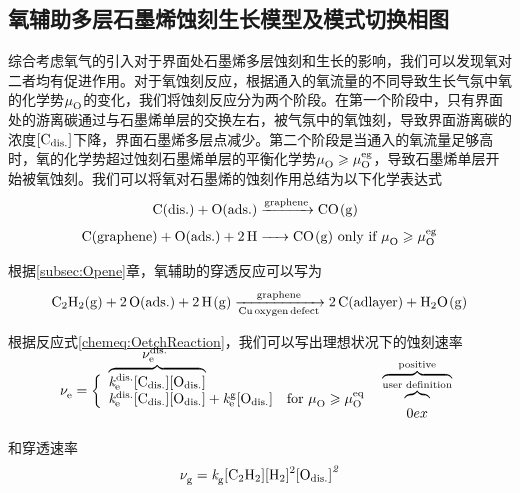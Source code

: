 \subsection{氧辅助多层石墨烯蚀刻生长模型及模式切换相图}
综合考虑氧气的引入对于界面处石墨烯多层蚀刻和生长的影响，我们可以发现氧对二者均有促进作用。对于氧蚀刻反应，根据通入的氧流量的不同导致生长气氛中氧的化学势$\mu_{\rm O}^{\rm } \it$的变化，我们将蚀刻反应分为两个阶段。在第一个阶段中，只有界面处的游离碳通过与石墨烯单层的交换左右，被气氛中的氧蚀刻，导致界面游离碳的浓度$\rm{\left[C_{dis.}\right]} \it$下降，界面石墨烯多层点减少。第二个阶段是当通入的氧流量足够高时，氧的化学势超过蚀刻石墨烯单层的平衡化学势$\mu_{\rm O}^{\rm } \it \geqslant \mu_{\rm O}^{\rm eg} \it$，导致石墨烯单层开始被氧蚀刻。我们可以将氧对石墨烯的蚀刻作用总结为以下化学表达式\chinesecolon
\begin{equation}
    \label{chemeq:OetchReaction}
    \begin{split}
        \cemb{C($\rm dis.$) + O($\rm ads.$) &->[graphene] CO(g)} \\
        \cemb{C(graphene) + O($\rm ads.$) + 2H &->[\vphantom{graphene}] CO(g) } \mbox{ only if $\muO{} \geqslant \muO{eg}$}
    \end{split}
\end{equation}

根据\ref{subsec:Opene}章，氧辅助的穿透反应可以写为\chinesecolon
\begin{align}
    \label{chemeq:OpeneReaction}
    \cemb{C2H2(g) + 2O($\rm ads.$) + 2H(g) ->[graphene][Cu oxygen defect] 2C(adlayer) + H2O(g)}
\end{align}

根据反应式\ref{chemeq:OetchReaction}，我们可以写出理想状况下的蚀刻速率\chinesecolon
\begin{equation}
    \RateV{e}{}=\left\{
        \begin{array}{ll}
        \smash[t]{\overbrace{\RateK{e}{dis.}\Cdis\Odis}^{\strut \mathclap{{\mbox{\normalsize $\RateV{e}{dis.}$ }}}}} & \mbox{} \vphantom{} \\
        \smash[b]{\RateK{e}{dis.}\Cdis\Odis+\RateK{e}{g}\Odis} & \mbox{for $\muO{} \geqslant \muO{eq}$} 
        \end{array}\right.
        \begin{array}{ll}
            \overbrace{\overbrace{\rule{0px}{3ex}{0ex}}^\text{user definition}}^\text{positive} \\
        \end{array}
\end{equation}

和穿透速率\chinesecolon
\begin{equation}
    \RateV{g}{}=\RateK{g}{}\cemb{[C2H2][H2]^2}\Odis^2
\end{equation}

